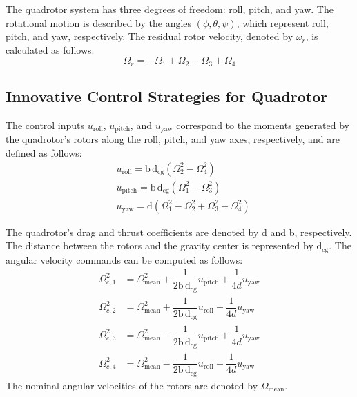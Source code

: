 \documentclass[3p,times]{elsarticle}
\begin{document}
The quadrotor system has three degrees of freedom: roll, pitch, and yaw. The rotational motion is described by the angles $(\phi, \theta, \psi)$, which represent roll, pitch, and yaw, respectively. The residual rotor velocity, denoted by $\omega_r$, is calculated as follows:
\begin{equation}
	\Omega_r = -\Omega_1 + \Omega_2 - \Omega_3 + \Omega_4
\end{equation}
\subsection{Innovative Control Strategies for Quadrotor}

\noindent The control inputs $u_{\text{roll}}$, $u_{\text{pitch}}$, and $u_{\text{yaw}}$ correspond to the moments generated by the quadrotor's rotors along the roll, pitch, and yaw axes, respectively, and are defined as follows:
\begin{align}
		&u_{\text{roll}} = \mathrm{b\,d}_{\text{cg}} (\Omega_2^2 - \Omega_4^2)\\
	&u_{\text{pitch}} = \mathrm{b\,d}_{\text{cg}} (\Omega_1^2 - \Omega_3^2) \\
	&u_{\text{yaw}} = \mathrm{d} (\Omega_1^2 - \Omega_2^2 + \Omega_3^2 - \Omega_4^2)
\end{align}

The quadrotor's drag and thrust coefficients are denoted by d and b, respectively. The distance between the rotors and the gravity center is represented by $\mathrm{d}_{\text{cg}}$. The angular velocity commands can be computed as follows:
\begin{align}
		\Omega_{c, 1}^2 &= \Omega_{\text{mean}}^2 + \dfrac{1}{2\mathrm{b\,d}_{\text{cg}}}u_{\text{pitch}} + \dfrac{1}{4d}u_{\text{yaw}} \\
	\Omega_{c, 2}^2 &= \Omega_{\text{mean}}^2 + \dfrac{1}{2\mathrm{b\,d}_{\text{cg}}}u_{\text{roll}} - \dfrac{1}{4d}u_{\text{yaw}}\\
	\Omega_{c, 3}^2 &= \Omega_{\text{mean}}^2 - \dfrac{1}{2\mathrm{b\,d}_{\text{cg}}}u_{\text{pitch}} + \dfrac{1}{4d}u_{\text{yaw}} \\
\Omega_{c, 4}^2 &= \Omega_{\text{mean}}^2 - \dfrac{1}{2\mathrm{b\,d}_{\text{cg}}}u_{\text{roll}} - \dfrac{1}{4d}u_{\text{yaw}}
\end{align}
The nominal angular velocities of the rotors are denoted by $\Omega_{\text{mean}}$.
\end{document}

